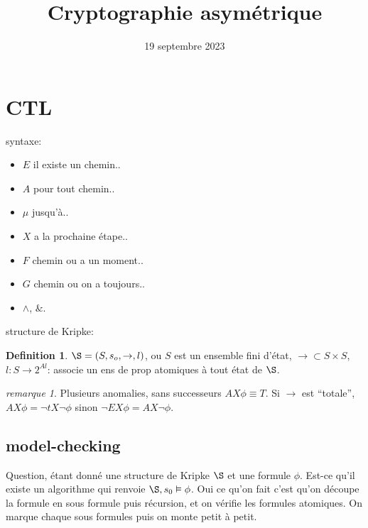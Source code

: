 \documentclass[12pt]{article}
\theoremstyle{plain}
\theoremstyle{definition}
\newtheorem{defn}[subsubsection]{Definition}
\theoremstyle{remark}
\newtheorem{rem}[subsection]{remarque}
\begin{document}
\title{Cryptographie asymétrique}
\date{19 septembre 2023}
\maketitle

\section{CTL}
syntaxe:
\begin{itemize}
    \item $E$ il existe un chemin..
    \item $A$ pour tout chemin..
    \item $\mu$ jusqu'à..
    \item $X$ a la prochaine étape..
    \item $F$ chemin ou a un moment.. 
    \item $G$ chemin ou on a toujours.. 
    \item $\wedge$, $\&$.

\end{itemize}
structure de Kripke:
\begin{defn}
    $\S=(S,s_o,\to,l)$, ou $S$ est un ensemble fini d'état, $\to\subset S\times S$,
    $l:S\to2^{Al}$: associe un ens de prop atomiques à tout état de $\S$.
\end{defn}
\begin{rem}
    Plusieurs anomalies, sans successeurs $AX\phi\equiv T$. 
    Si $\to$ est ``totale'', $AX\phi=\neg tX\neg\phi$ sinon $\neg EX\phi=AX\neg\phi$.
\end{rem}
\subsection{model-checking}
Question, étant donné une structure de Kripke $\S$ et une formule $\phi$.
Est-ce qu'il existe un algorithme qui renvoie $\S,s_0\vDash \phi$. 
Oui ce qu'on fait c'est qu'on découpe la formule en sous formule puis récursion, 
et on vérifie les formules atomiques. On marque chaque sous formules puis on monte 
petit à petit.
\end{document}
